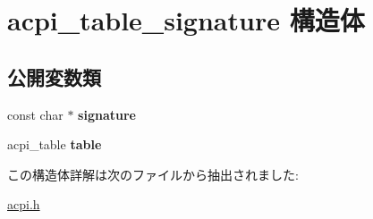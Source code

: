 \hypertarget{structacpi__table__signature}{}\section{acpi\+\_\+table\+\_\+signature 構造体}
\label{structacpi__table__signature}
\subsection*{公開変数類}
\begin{DoxyCompactItemize}
\item 
\hypertarget{structacpi__table__signature_a87be14e749692c2d9fa195efffd748da}{}const char $\ast$ {\bfseries signature}\label{structacpi__table__signature_a87be14e749692c2d9fa195efffd748da}

\item 
\hypertarget{structacpi__table__signature_a055c98fc7371554dadbacdaf538e4583}{}acpi\+\_\+table {\bfseries table}\label{structacpi__table__signature_a055c98fc7371554dadbacdaf538e4583}

\end{DoxyCompactItemize}


この構造体詳解は次のファイルから抽出されました\+:\begin{DoxyCompactItemize}
\item 
\hyperlink{acpi_8h}{acpi.\+h}\end{DoxyCompactItemize}
